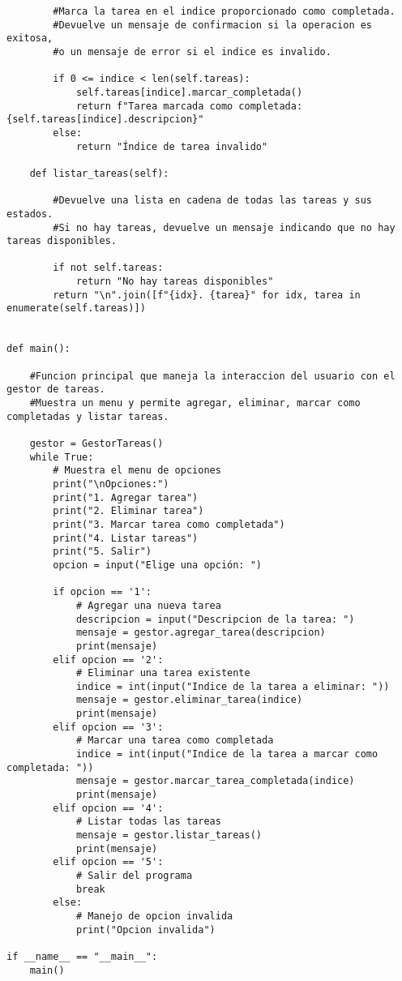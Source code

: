\documentclass[10pt,a4paper]{article}
\begin{document}
\begin{lstlisting}
        #Marca la tarea en el indice proporcionado como completada.
        #Devuelve un mensaje de confirmacion si la operacion es exitosa,
        #o un mensaje de error si el indice es invalido.
        
        if 0 <= indice < len(self.tareas):
            self.tareas[indice].marcar_completada()
            return f"Tarea marcada como completada: {self.tareas[indice].descripcion}"
        else:
            return "Índice de tarea invalido"

    def listar_tareas(self):
        
        #Devuelve una lista en cadena de todas las tareas y sus estados.
        #Si no hay tareas, devuelve un mensaje indicando que no hay tareas disponibles.
        
        if not self.tareas:
            return "No hay tareas disponibles"
        return "\n".join([f"{idx}. {tarea}" for idx, tarea in enumerate(self.tareas)])


def main():
    
    #Funcion principal que maneja la interaccion del usuario con el gestor de tareas.
    #Muestra un menu y permite agregar, eliminar, marcar como completadas y listar tareas.
    
    gestor = GestorTareas()
    while True:
        # Muestra el menu de opciones
        print("\nOpciones:")
        print("1. Agregar tarea")
        print("2. Eliminar tarea")
        print("3. Marcar tarea como completada")
        print("4. Listar tareas")
        print("5. Salir")
        opcion = input("Elige una opción: ")

        if opcion == '1':
            # Agregar una nueva tarea
            descripcion = input("Descripcion de la tarea: ")
            mensaje = gestor.agregar_tarea(descripcion)
            print(mensaje)
        elif opcion == '2':
            # Eliminar una tarea existente
            indice = int(input("Indice de la tarea a eliminar: "))
            mensaje = gestor.eliminar_tarea(indice)
            print(mensaje)
        elif opcion == '3':
            # Marcar una tarea como completada
            indice = int(input("Indice de la tarea a marcar como completada: "))
            mensaje = gestor.marcar_tarea_completada(indice)
            print(mensaje)
        elif opcion == '4':
            # Listar todas las tareas
            mensaje = gestor.listar_tareas()
            print(mensaje)
        elif opcion == '5':
            # Salir del programa
            break
        else:
            # Manejo de opcion invalida
            print("Opcion invalida")

if __name__ == "__main__":
    main()

\end{lstlisting}
\newpage
\end{document}
